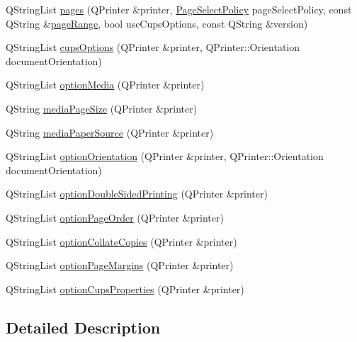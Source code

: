 \begin{DoxyCompactItemize}
\item 
Q\+String\+List \hyperlink{classOkular_1_1FilePrinter_ae069e0709a742d926eb7b7c8c527e603}{pages} (Q\+Printer \&printer, \hyperlink{classOkular_1_1FilePrinter_a755b647910344031db1d79312482981d}{Page\+Select\+Policy} page\+Select\+Policy, const Q\+String \&\hyperlink{classOkular_1_1FilePrinter_a7a62a72292d1756871321f48446927e3}{page\+Range}, bool use\+Cups\+Options, const Q\+String \&version)
\item 
Q\+String\+List \hyperlink{classOkular_1_1FilePrinter_a0009250603cbc9d3f9d346d9a56544e2}{cups\+Options} (Q\+Printer \&printer, Q\+Printer\+::\+Orientation document\+Orientation)
\item 
Q\+String\+List \hyperlink{classOkular_1_1FilePrinter_a7d41d2f77f811ce693b2246407db97db}{option\+Media} (Q\+Printer \&printer)
\item 
Q\+String \hyperlink{classOkular_1_1FilePrinter_a103b33a5779433d55fe5d5dbe2541d30}{media\+Page\+Size} (Q\+Printer \&printer)
\item 
Q\+String \hyperlink{classOkular_1_1FilePrinter_af21ae5cbf7d73822174d474374c1368b}{media\+Paper\+Source} (Q\+Printer \&printer)
\item 
Q\+String\+List \hyperlink{classOkular_1_1FilePrinter_a489dde1a1693f71a6668869e3a7bb833}{option\+Orientation} (Q\+Printer \&printer, Q\+Printer\+::\+Orientation document\+Orientation)
\item 
Q\+String\+List \hyperlink{classOkular_1_1FilePrinter_af4a17e5901cfba00e2aa2b7dbe09351f}{option\+Double\+Sided\+Printing} (Q\+Printer \&printer)
\item 
Q\+String\+List \hyperlink{classOkular_1_1FilePrinter_a6e5d5320e8ac11fc4401cd0c3b1d7c53}{option\+Page\+Order} (Q\+Printer \&printer)
\item 
Q\+String\+List \hyperlink{classOkular_1_1FilePrinter_aace0a07484dc8511baf535687485cde8}{option\+Collate\+Copies} (Q\+Printer \&printer)
\item 
Q\+String\+List \hyperlink{classOkular_1_1FilePrinter_a2f877f9b3c612fec484c7f55b16f2f21}{option\+Page\+Margins} (Q\+Printer \&printer)
\item 
Q\+String\+List \hyperlink{classOkular_1_1FilePrinter_ad635cb81e76102f996b0216ef65b55ed}{option\+Cups\+Properties} (Q\+Printer \&printer)
\end{DoxyCompactItemize}


\subsection{Detailed Description}



